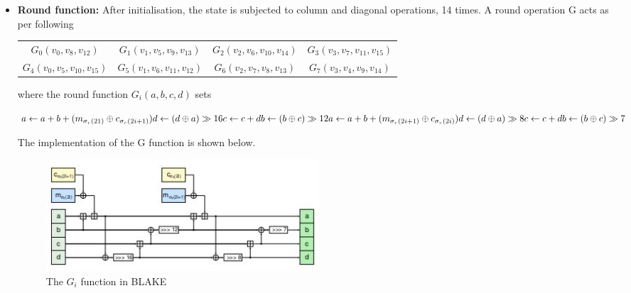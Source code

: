 \begin{itemize}
    \item {\bf Round function:} After initialisation, the state is subjected to column and diagonal operations, 14
    times. A round operation G acts as per following

    \begin{table}
      \begin{center}
        \begin{tabular}{ *{4}{c}}
        $ G_{0}(v_{0}, v_{8}, v_{12})$ & $G_{1}(v_{1}, v_{5}, v_{9}, v_{13})$ & $G_{2}(v_{2}, v_{6}, v_{10}, v_{14})$ & $G_{3}(v_{3}, v_{7}, v_{11}, v_{15}) $\\
 $G_{4}(v_{0}, v_{5}, v_{10}, v_{15})$ & $G_{5}(v_{1}, v_{6}, v_{11}, v_{12})$ & $G_{6}(v_{2}, v_{7}, v_{8}, v_{13})$ & $G_{7}(v_{3}, v_{4}, v_{9}, v_{14})$
        \end{tabular}
      \end{center}
    \end{table}


    where the round function $G_{i}(a, b, c, d)$ sets

    \newpage
    
    $
    a \gets a + b + (m_{\sigma_{r}(21)} \oplus c_{\sigma_{r}(2i + 1)}) \\
    d \gets (d \oplus a) \gg 16 \\
    c \gets c + d \\
    b \gets (b \oplus c) \gg 12 \\
    a \gets a + b + (m_{\sigma_{r}(2i + 1)} \oplus c_{\sigma_{r}(2i)}) \\
    d \gets (d \oplus a) \gg 8 \\
    c \gets c + d \\
    b \gets (b \oplus c) \gg 7
    $

    The implementation of the G function is shown below.
    \begin{figure}[h]
      \begin{center}
        \includegraphics[width=4in]{blakeGfunction.jpg}
      \end{center}
      \caption{The $G_{i}$ function in BLAKE\cite{00002}}
      \label{fig:lab}
    \end{figure}


\end{itemize}
